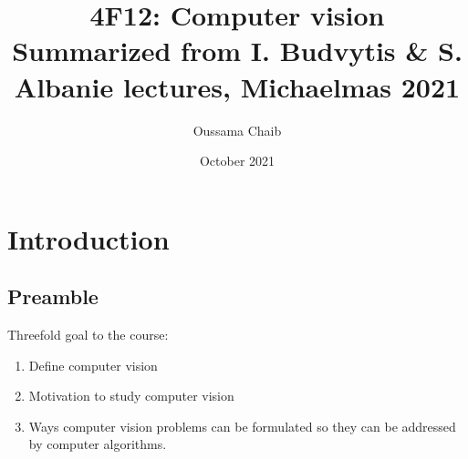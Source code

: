 \documentclass[a4paper,11pt]{article}
\title{%
	4F12: Computer vision \\
	\vspace{10pt}
	\small Summarized from I. Budvytis \& S. Albanie lectures, Michaelmas 2021}
\author{\small Oussama Chaib}
\date{\small October 2021}
\begin{document}
	\maketitle
\section{Introduction}
\subsection{Preamble}
Threefold goal to the course:
\begin{enumerate}
	\item Define computer vision
	\item Motivation to study computer vision
	\item Ways computer vision problems can be formulated so they can be addressed by computer algorithms.
\end{enumerate}
\end{document}
